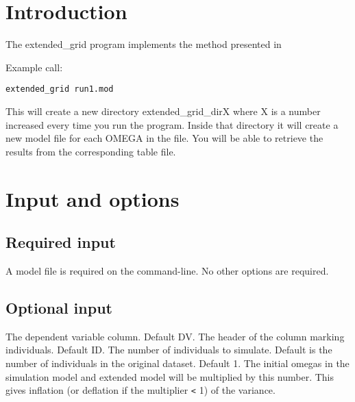 




\maketitle
\newcommand{\guidetoolname}{extended\_grid}


\section{Introduction}
The extended\_grid program implements the method presented in \cite{Savic}

Example call:
\begin{verbatim}
extended_grid run1.mod
\end{verbatim}

This will create a new directory extended\_grid\_dirX where X is a number increased every time you run the program. Inside that
directory it will create a new model file for each OMEGA in the file. You will be able to retrieve the results from the
corresponding table file.

\section{Input and options}

\subsection{Required input}
A model file is required on the command-line. No other options are required.
	
\subsection{Optional input}	
\begin{optionlist}
The dependent variable column. Default DV. 
\nextopt
{}
The header of the column marking individuals. Default ID.
\nextopt
{}
The number of individuals to simulate. Default is the number of individuals in the original dataset.   
\nextopt
{}
Default 1. The initial omegas in the simulation model and extended model will be multiplied by this number. This gives inflation (or deflation if the multiplier \verb|<| 1) of the variance.

\nextopt
\end{optionlist}

